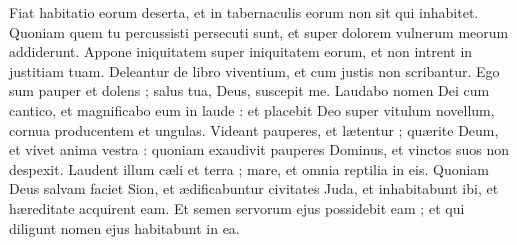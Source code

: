 {\VERSE Fiat habitatio eorum deserta, et in tabernaculis eorum non sit qui inhabitet. \EVERSE
\VERSE Quoniam quem tu percussisti persecuti sunt, et super dolorem vulnerum meorum addiderunt. \EVERSE
\VERSE Appone iniquitatem super iniquitatem eorum, et non intrent in justitiam tuam. \EVERSE
\VERSE Deleantur de libro viventium, et cum justis non scribantur. \EVERSE
\VERSE Ego sum pauper et dolens ; salus tua,  Deus,  suscepit me. \EVERSE
\VERSE Laudabo nomen Dei cum cantico, et magnificabo eum in laude : \EVERSE
\VERSE et placebit Deo super vitulum novellum, cornua producentem et ungulas. \EVERSE
\VERSE Videant pauperes,  et lætentur ; quærite Deum,  et vivet anima vestra : \EVERSE
\VERSE quoniam exaudivit pauperes Dominus, et vinctos suos non despexit. \EVERSE
\VERSE Laudent illum cæli et terra ; mare,  et omnia reptilia in eis. \EVERSE
\VERSE Quoniam Deus salvam faciet Sion, et ædificabuntur civitates Juda, 
et inhabitabunt ibi,  et hæreditate acquirent eam. \EVERSE
\VERSE Et semen servorum ejus possidebit eam ; et qui diligunt nomen ejus habitabunt in ea.

}
\newcommand{\psalmlxix}{
\VERSE In finem. Psalmus David in rememorationem,  quod salvum fecerit eum Dominus.\VERSE Deus,  in adjutorium meum intende ; Domine,  ad adjuvandum me festina. \EVERSE
\VERSE Confundantur,  et revereantur,  qui quærunt animam meam.\VERSE Avertantur retrorsum,  et erubescant,  qui volunt mihi mala ; avertantur statim erubescentes qui dicunt mihi : Euge,  euge ! \EVERSE
\VERSE Exsultent et lætentur in te omnes qui quærunt te ; et dicant semper : Magnificetur Dominus,  qui diligunt salutare tuum. \EVERSE
\VERSE Ego vero egenus et pauper sum ; Deus,  adjuva me.
Adjutor meus et liberator meus es tu ; 
Domine,  ne moreris.

}
